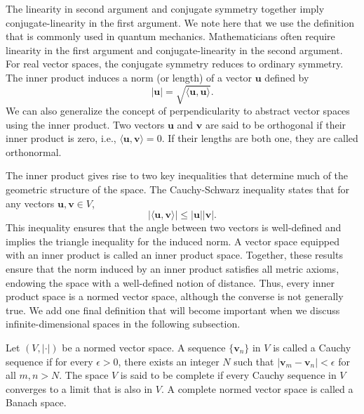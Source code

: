 The linearity in second argument and conjugate symmetry together imply conjugate-linearity in the first argument. We note here that we use the definition that is commonly used in quantum mechanics.\supercite{1164152357,633612145} Mathematicians often require linearity in the first argument and conjugate-linearity in the second argument. For real vector spaces, the conjugate symmetry reduces to ordinary symmetry. The inner product induces a norm (or length) of a vector $\symbf{u}$ defined by
\begin{equation}
\lvert\symbf{u}\rvert=\sqrt{\langle\symbf{u},\symbf{u}\rangle}.
\end{equation}
We can also generalize the concept of perpendicularity to abstract vector spaces using the inner product. Two vectors $\symbf{u}$ and $\symbf{v}$ are said to be orthogonal if their inner product is zero, i.e., $\langle\symbf{u},\symbf{v}\rangle=0$. If their lengths are both one, they are called orthonormal.

The inner product gives rise to two key inequalities that determine much of the geometric structure of the space. The Cauchy-Schwarz inequality states that for any vectors $\symbf{u},\symbf{v}\in V$,
\begin{equation}
\lvert\langle\symbf{u},\symbf{v}\rangle\rvert\leq\lvert\symbf{u}\rvert\lvert\symbf{v}\rvert.
\end{equation}
This inequality ensures that the angle between two vectors is well-defined and implies the triangle inequality for the induced norm. A vector space equipped with an inner product is called an inner product space. Together, these results ensure that the norm induced by an inner product satisfies all metric axioms, endowing the space with a well-defined notion of distance.\supercite{633612145} Thus, every inner product space is a normed vector space, although the converse is not generally true. We add one final definition that will become important when we discuss infinite-dimensional spaces in the following subsection.
\begin{definition}
Let $(V,\lvert\cdot\rvert)$ be a normed vector space. A sequence $\lbrace\symbf{v}_n\rbrace$ in $V$ is called a Cauchy sequence if for every $\epsilon>0$, there exists an integer $N$ such that $\lvert\symbf{v}_m-\symbf{v}_n\rvert<\epsilon$ for all $m,n>N$. The space $V$ is said to be complete if every Cauchy sequence in $V$ converges to a limit that is also in $V$. A complete normed vector space is called a Banach space.
\end{definition}
